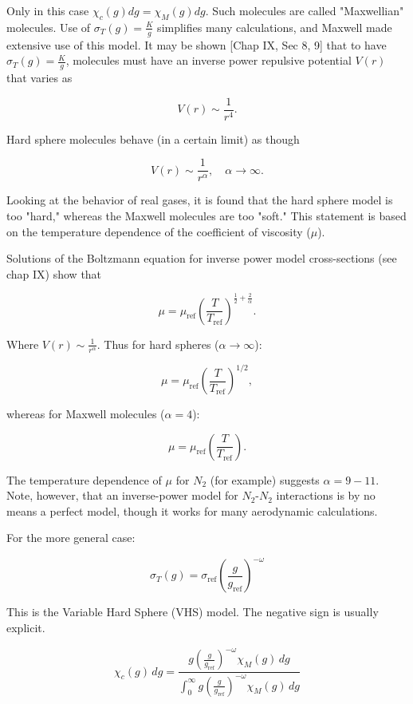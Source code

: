 \documentclass{article}
\begin{document}
Only in this case \(\chi_c(g) dg = \chi_M(g) dg\). Such molecules are called "Maxwellian" molecules. Use of \(\sigma_T(g) = \frac{K}{g}\) simplifies many calculations, and Maxwell made extensive use of this model. It may be shown [Chap IX, Sec 8, 9] that to have \(\sigma_T(g) = \frac{K}{g}\), molecules must have an inverse power repulsive potential \(V(r)\) that varies as

\[
V(r) \sim \frac{1}{r^4}.
\]

Hard sphere molecules behave (in a certain limit) as though

\[
V(r) \sim \frac{1}{r^\alpha}, \quad \alpha \to \infty.
\]


Looking at the behavior of real gases, it is found that the hard sphere model is too "hard," whereas the Maxwell molecules are too "soft." This statement is based on the temperature dependence of the coefficient of viscosity (\(\mu\)).

Solutions of the Boltzmann equation for inverse power model cross-sections (see chap IX) show that

\[
\mu = \mu_{\text{ref}} \left( \frac{T}{T_{\text{ref}}} \right)^{\frac{1}{2} + \frac{2}{\alpha}}.
\]

Where \(V(r) \sim \frac{1}{r^\alpha}\). Thus for hard spheres (\(\alpha \to \infty\)):

\[
\mu = \mu_{\text{ref}} \left( \frac{T}{T_{\text{ref}}} \right)^{1/2},
\]

whereas for Maxwell molecules (\(\alpha = 4\)):

\[
\mu = \mu_{\text{ref}} \left( \frac{T}{T_{\text{ref}}} \right).
\]


The temperature dependence of \(\mu\) for \(N_2\) (for example) suggests \(\alpha = 9 - 11\). Note, however, that an inverse-power model for \(N_2\)-\(N_2\) interactions is by no means a perfect model, though it works for many aerodynamic calculations.



\newpage


For the more general case:

\[
\sigma_T(g) = \sigma_{\text{ref}} \left( \frac{g}{g_{\text{ref}}} \right)^{-\omega}
\]

This is the Variable Hard Sphere (VHS) model. The negative sign is usually explicit.

\[
\chi_c(g) \, dg = \frac{g \left( \frac{g}{g_{\text{ref}}} \right)^{-\omega} \chi_M(g) \, dg}{\int_0^{\infty} g \left( \frac{g}{g_{\text{ref}}} \right)^{-\omega} \chi_M(g) \, dg}
\]
\end{document}
